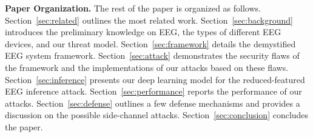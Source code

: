 \indent \textbf{Paper Organization.} The rest of the paper is organized as follows. Section~\ref{sec:related} outlines the most related work. Section~\ref{sec:background} introduces the preliminary knowledge on EEG, the types of different EEG devices, and our threat model. Section~\ref{sec:framework} details the demystified EEG system framework. Section~\ref{sec:attack} demonstrates the security flaws of the framework and the implementations of our attacks based on these flaws. Section~\ref{sec:inference} presents our deep learning model for the reduced-featured EEG inference attack. Section~\ref{sec:performance} reports the performance of our attacks. Section~\ref{sec:defense} outlines a few defense mechanisms and provides a discussion on the possible side-channel attacks. Section~\ref{sec:conclusion} concludes the paper.


